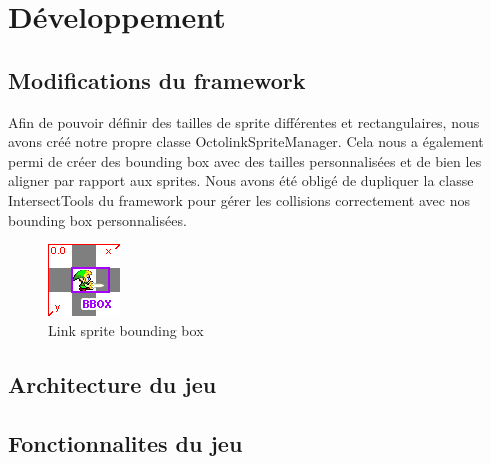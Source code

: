 \chapter{Développement}

\section{Modifications du framework}

Afin de pouvoir définir des tailles de sprite différentes et rectangulaires, nous avons créé notre propre classe OctolinkSpriteManager. Cela nous a également permi de créer des bounding box avec des tailles personnalisées et de bien les aligner par rapport aux sprites. Nous avons été obligé de dupliquer la classe IntersectTools du framework pour gérer les collisions correctement avec nos bounding box personnalisées.

\begin{figure}[ht!]
  \center
  \includegraphics{resources/bbox.png}
  \caption{Link sprite bounding box}
  \label{fig:Link sprite bounding box}
\end{figure}


\section{Architecture du jeu}

\section{Fonctionnalites du jeu}

